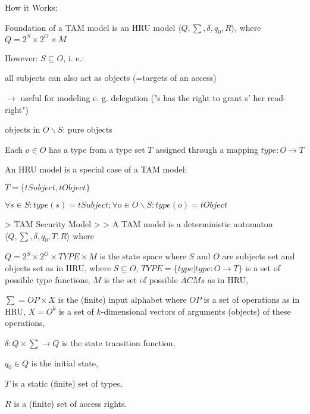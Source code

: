 \documentclass[a4paper]{article}
\begin{document}
\begin{multicols}{3}
    How it Works:
    \begin{itemize*}
        \item Foundation of a TAM model is an HRU model $⟨Q,\sum,\delta,q_0 ,R⟩$, where $Q= 2^S\times 2^O\times M$
        \item However: $S\subseteq O$, i. e.:
              \begin{itemize*}
                  \item all subjects can also act as objects (=targets of an access)
                  \item $\rightarrow$  useful for modeling e. g. delegation ("s has the right to grant s' her read-right")
                  \item objects in $O\backslash S$: pure objects
              \end{itemize*}
        \item Each $o\in O$ has a type from a type set $T$ assigned through a mapping $type:O\rightarrow T$
        \item An HRU model is a special case of a TAM model:
              \begin{itemize*}
                  \item $T=\{tSubject,tObject\}$
                  \item $\forall s\in S:type(s)=tSubject; \forall o\in O\backslash S:type(o)=tObject$
              \end{itemize*}
    \end{itemize*}

    > TAM Security Model
    >
    > A TAM model is a deterministic automaton $⟨Q,\sum,\delta,q_0 ,T,R⟩$ where
    \begin{itemize*}
        \item $Q= 2^S\times 2^O\times TYPE\times M$ is the state space where $S$ and $O$ are subjects set and objects set as in HRU, where $S\subseteq O$, $TYPE=\{type|type:O\rightarrow T\}$ is a set of possible type functions, $M$ is the set of possible $ACMs$ as in HRU,
        \item $\sum=OP\times X$ is the (finite) input alphabet where $OP$ is a set of operations as in HRU, $X=O^k$ is a set of $k$-dimensional vectors of arguments (objects) of these operations,
        \item $\delta:Q\times\sum\rightarrow Q$ is the state transition function,
        \item $q_0\in Q$ is the initial state,
        \item $T$ is a static (finite) set of types,
        \item $R$ is a (finite) set of access rights.
    \end{itemize*}


\end{multicols}
\end{document}
